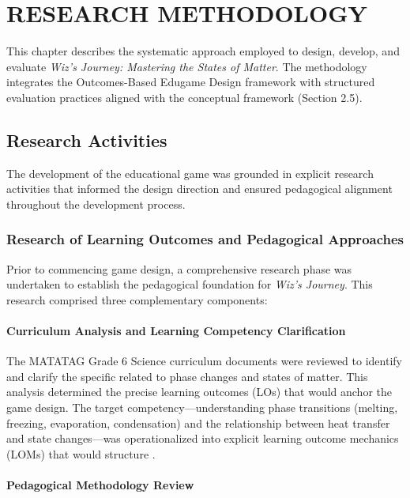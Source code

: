 \chapter{RESEARCH METHODOLOGY}

This chapter describes the systematic approach employed to design, develop, and evaluate \textit{Wiz's Journey: Mastering the States of Matter}. The methodology integrates the Outcomes-Based Edugame Design framework \cite{Sison2018} with structured evaluation practices aligned with the conceptual framework (Section 2.5).

\section{Research Activities}

The development of the educational game was grounded in explicit research activities that informed the design direction and ensured pedagogical alignment throughout the development process.

\subsection{Research of Learning Outcomes and Pedagogical Approaches}

Prior to commencing game design, a comprehensive research phase was undertaken to establish the pedagogical foundation for \textit{Wiz's Journey}. This research comprised three complementary components:

\subsubsection{Curriculum Analysis and Learning Competency Clarification}

The MATATAG Grade 6 Science curriculum documents were reviewed to identify and clarify the specific  related to phase changes and states of matter. This analysis determined the precise learning outcomes (LOs) that would anchor the game design. The target competency---understanding phase transitions (melting, freezing, evaporation, condensation) and the relationship between heat transfer and state changes---was operationalized into explicit learning outcome mechanics (LOMs) that would structure  \cite{Sison2018}.

\subsubsection{Pedagogical Methodology Review}

